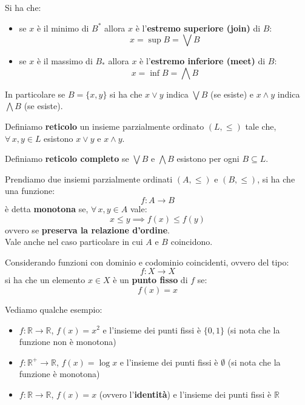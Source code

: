 \documentclass[a4paper,12pt, oneside]{book}
\begin{document}
\begin{definizione}
  Si ha che:
  \begin{itemize}
    \item se $x$ è il minimo di $B^*$ allora $x$ è l'\textbf{estremo superiore
      (join)} di $B$:
    \[x=\sup B=\bigvee B\]
    \item se $x$ è il massimo di $B_*$ allora $x$ è l'\textbf{estremo inferiore
      (meet)} di $B$:
    \[x=\inf B=\bigwedge B\]
  \end{itemize}
  In particolare se $B=\{x,y\}$ si ha che $x\lor y$ indica $\bigvee B$ (se
  esiste) e $x\land y$ indica $\bigwedge B$ (se esiste).
\end{definizione}
\begin{definizione}
  Definiamo \textbf{reticolo} un insieme parzialmente ordinato $(L,\leq)$ tale
  che, $\forall\,x,y\in L$ esistono $x\lor y$ e $x\land y$.
\end{definizione}
\begin{definizione} 
  Definiamo \textbf{reticolo completo} se $\bigvee B$ e $\bigwedge B$ esistono
  per ogni $B\subseteq L$.
\end{definizione}
\begin{definizione}
  Prendiamo due insiemi parzialmente ordinati $(A,\leq)$ e $(B,\leq)$, si ha che
  una funzione:
  \[f:A\to B\]
  è detta \textbf{monotona} se, $\forall\,x,y\in A$ vale:
  \[x\leq y\implies f(x)\leq f(y)\]
  ovvero se \textbf{preserva la relazione d'ordine}.\\
  Vale anche nel caso particolare in cui $A$ e $B$ coincidono.
\end{definizione}
\begin{definizione}
  Considerando funzioni con dominio e codominio coincidenti, ovvero del tipo:
  \[f:X\to X\]
  si ha che un elemento $x\in X$ è un \textbf{punto fisso} di $f$ se:
  \[f(x)=x\]
\end{definizione}
\begin{esempio}
  Vediamo qualche esempio:
  \begin{itemize}
    \item $f:\mathbb{R}\to\mathbb{R}$, $f(x)=x^2$ e l'insieme dei punti fissi è
    $\{0,1\}$ (si nota che la funzione non è monotona)
    \item $f:\mathbb{R}^+\to\mathbb{R}$, $f(x)=\log x$ e l'insieme dei punti
    fissi è $\emptyset$ (si nota che la funzione è monotona)
    \item $f:\mathbb{R}\to\mathbb{R}$, $f(x)=x$ (ovvero l'\textbf{identità}) e
    l'insieme dei punti fissi è $\mathbb{R}$ 
  \end{itemize}
\end{esempio}
\end{document}
